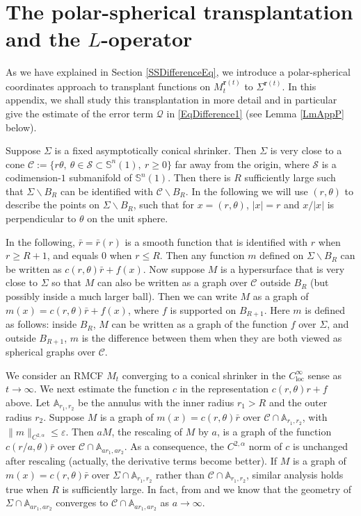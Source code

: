 \documentclass[12pt]{amsart}
\numberwithin{equation}{section}
\numberwithin{equation}{section}
\newcommand{\eps}{\varepsilon}
\newcommand{\al}{\alpha}
\newcommand{\cC}{\mathcal{C}}
\DeclareMathOperator{\loc}{loc}
\begin{document}
	
	\section{The polar-spherical transplantation and the $L$-operator}\label{AppP}
	As we have explained in Section \ref{SSDifferenceEq}, we introduce a polar-spherical coordinates approach to transplant functions on $M_t^{\mathbf r(t)}$ to $\Sigma^{\mathbf r(t)}$. In this appendix, we shall study this transplantation in more detail and in particular give the estimate of the error term $\mathcal Q$ in \eqref{EqDifference1} (see Lemma \ref{LmAppP} below). 
	
	Suppose $\Sigma$ is a fixed asymptotically conical shrinker. Then $\Sigma$ is very close to a cone $\cC:=\{r \theta,\ \theta\in \mathcal S\subset\mathbb S^n(1),\ r\geq 0\}$ far away from the origin, where $\mathcal S$ is a codimension-$1$ submanifold of $\mathbb S^n(1)$.  Then there is $R$ sufficiently large such that $\Sigma\backslash B_R$ can be identified with $\cC\backslash B_R$. In the following we will use $(r,\theta)$ to describe the points on $\Sigma\backslash B_R$, such that for $x=(r,\theta)$, $|x|=r$ and $x/|x|$ is perpendicular to $\theta$ on the unit sphere.
	
	In the following, $\bar r=\bar r(r)$ is a smooth function that is identified with $r$ when $r\geq R+1$, and equals $0$ when $r\leq R$. Then any function $m$ defined on $\Sigma\backslash B_R$ can be written as $c(r,\theta)\bar r+f(x)$.
	Now suppose $M$ is a hypersurface that is very close to $\Sigma$ so that $M$ can also be written as a graph over $\cC$ outside $B_R$ (but possibly inside a much larger ball). Then we can write $M$ as a graph of $m(x)=c(r,\theta)\bar r+f(x)$, where $f$ is supported on $B_{R+1}$. Here $m$ is defined as follows: inside $B_{R}$, $M$ can be written as a graph of the function $f$ over $\Sigma$, and outside $B_{R+1}$, $m$ is the difference between them when they are both viewed as spherical graphs over $\cC$.
	
	We consider an RMCF $M_t$ converging to a conical shrinker in the $C^\infty_{\loc}$ sense as $t\to\infty$. We next estimate the function $c$ in the representation $c(r,\theta)r+f$ above. Let $\mathbb A_{r_1,r_2}$ be the annulus with the inner radius $r_1>R$ and the outer radius $r_2$. Suppose $M$ is a graph of $m(x)=c(r,\theta)\bar r$ over $\cC\cap \mathbb A_{r_1,r_2}$, with $\|m\|_{C^{2,\alpha}}\leq \eps$. Then $aM$, the rescaling of $M$ by $a$, is a graph of the function $c(r/a,\theta)\bar r$ over $\cC\cap \mathbb A_{ar_1,ar_2}$. As a consequence, the $C^{2,\al}$ norm of $c$ is unchanged after rescaling (actually, the derivative terms become better).
	If $M$ is a graph of $m(x)=c(r,\theta)\bar r$ over $\Sigma\cap \mathbb A_{r_1,r_2}$ rather than $\cC\cap \mathbb A_{r_1,r_2}$, similar analysis holds true when $R$ is sufficiently large. In fact, from \cite{BW} and \cite{CS} we know that the geometry of $\Sigma\cap \mathbb A_{ar_1,ar_2}$ converges to $\cC\cap \mathbb A_{ar_1,ar_2}$ as $a\to\infty$.
	
\end{document}
